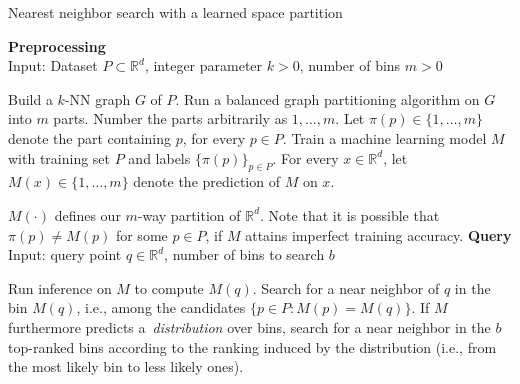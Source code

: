 \documentclass[11pt]{article}
\newcommand{\R}{\mathbb R}
\begin{document}
\newcommand{\INDENT}{\hspace{1em}}
\begin{algorithm}[!t]
\caption{Nearest neighbor search with a learned space partition}
\label{piotr_alg:main}
\smallskip
\textbf{Preprocessing}\\ 
Input: Dataset $P\subset\R^d$, integer parameter $k>0$, number of bins $m>0$
\smallskip
\smallskip
\begin{algorithmic}[1]
   \STATE Build a $k$-NN graph $G$ of $P$.
   \STATE Run a balanced graph partitioning algorithm on $G$ into $m$ parts. Number the parts arbitrarily as $1,\ldots,m$. Let $\pi(p)\in\{1,\ldots,m\}$ denote the part containing $p$, for every $p\in P$.
   \STATE Train a machine learning model $M$ with training set $P$ and labels $\{\pi(p)\}_{p\in P}$. For every $x\in\R^d$, let $M(x)\in\{1,\ldots,m\}$ denote the prediction of $M$ on $x$.
\smallskip
\end{algorithmic}
\smallskip
$M(\cdot)$ defines our $m$-way partition of $\R^d$. Note that it is possible that $\pi(p)\neq M(p)$ for some $p\in P$, if $M$ attains imperfect training accuracy.
\smallskip
\smallskip
\textbf{Query}\\ 
Input: query point $q\in\R^d$, number of bins to search $b$
\smallskip
\smallskip
\begin{algorithmic}[1]
   \STATE Run inference on $M$ to compute $M(q)$.
   \STATE Search for a near neighbor of $q$ in the bin $M(q)$, i.e., among the candidates $\{p\in P:M(p)=M(q)\}$.
   \STATE If $M$ furthermore predicts a~\emph{distribution} over bins, search for a near neighbor in the $b$ top-ranked bins according to the ranking induced by the distribution (i.e., from the most likely bin to less likely ones).
\smallskip
\end{algorithmic}
\end{algorithm}

\end{document}
